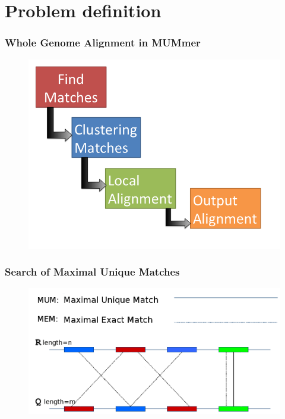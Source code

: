 \documentclass{beamer}
\begin{document}
\section{Problem definition}
\begin{frame}
  \frametitle{Whole Genome Alignment in MUMmer}
  \begin{figure}\includegraphics[scale=0.4]{wga.png}\end{figure}
\end{frame}
\begin{frame}
\frametitle{Search of Maximal Unique Matches}
\begin{figure}\includegraphics[scale=0.38]{mem-mum.png}\end{figure}
\end{frame}
\end{document}
